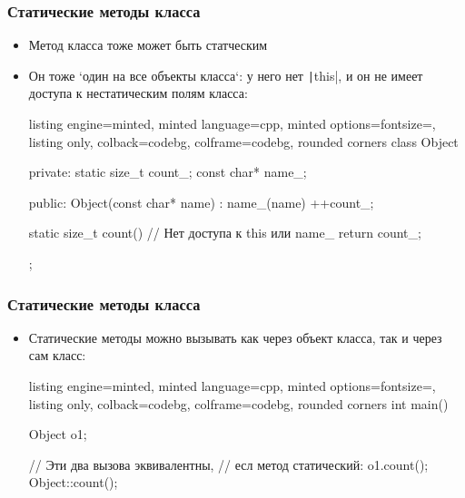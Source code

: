\documentclass[10pt]{beamer}
\begin{document}
\begin{frame}[fragile]
\frametitle{Статические методы класса}
\begin{itemize}
\item Метод класса тоже может быть статческим
\pause
\item Он тоже `один на все объекты класса`: у него нет \texttt|this|, и он не имеет доступа к нестатическим полям класса:
\begin{tcblisting}{listing engine=minted, minted language=cpp, minted options={fontsize=\scriptsize}, listing only, colback=codebg, colframe=codebg, rounded corners}
class Object {
private:
  static size_t count_;
  const char* name_;

public:
  Object(const char* name)
    : name_(name)
  {
    ++count_;
  }

  static size_t count() {
    // Нет доступа к this или name_
    return count_;
  }
};
\end{tcblisting}
\end{itemize}
\end{frame}

\begin{frame}[fragile]
\frametitle{Статические методы класса}
\begin{itemize}
\item Статические методы можно вызывать как через объект класса, так и через сам класс:
\begin{tcblisting}{listing engine=minted, minted language=cpp, minted options={fontsize=\scriptsize}, listing only, colback=codebg, colframe=codebg, rounded corners}
int main() {
  Object o1;

  // Эти два вызова эквивалентны,
  // есл метод статический:
  o1.count();
  Object::count();
}
\end{tcblisting}
\end{itemize}
\end{frame}
\end{document}
